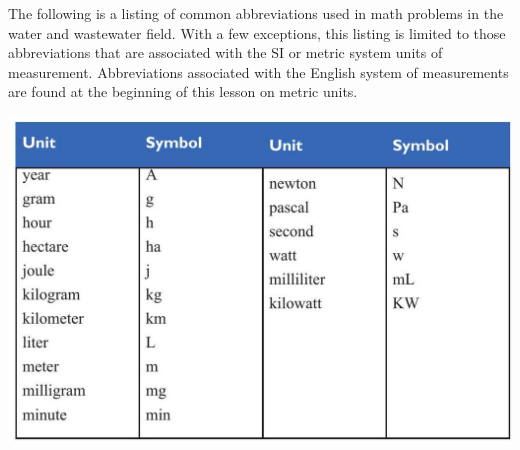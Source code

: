 \documentclass[10pt]{article}
\begin{document}
The following is a listing of common abbreviations used in math problems in the water and wastewater field. With a few exceptions, this listing is limited to those abbreviations that are associated with the SI or metric system units of measurement. Abbreviations associated with the English system of measurements are found at the beginning of this lesson on metric units.

\includegraphics[max width=\textwidth]{2022_09_11_72dbedc910e6e984560cg-54}
\end{document}
